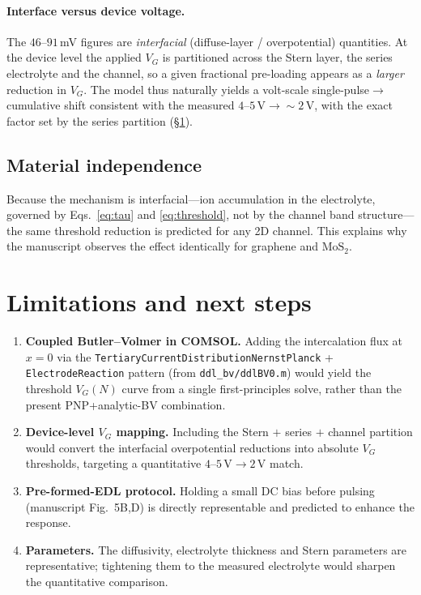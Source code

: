 \documentclass[11pt,a4paper]{article}
\begin{document}
\paragraph{Interface versus device voltage.} The $46$--$91$\,mV figures are
\emph{interfacial} (diffuse-layer / overpotential) quantities. At the device
level the applied $V_G$ is partitioned across the Stern layer, the series
electrolyte and the channel, so a given fractional pre-loading appears as a
\emph{larger} reduction in $V_G$. The model thus naturally yields a volt-scale
single-pulse$\to$cumulative shift consistent with the measured
$4$--$5\,\text{V}\to{\sim}2\,\text{V}$, with the exact factor set by the series
partition (\S\ref{sec:next}).

\subsection{Material independence}
Because the mechanism is interfacial---ion accumulation in the electrolyte,
governed by Eqs.~\eqref{eq:tau} and \eqref{eq:threshold}, not by the channel band
structure---the same threshold reduction is predicted for any 2D channel. This
explains why the manuscript observes the effect identically for graphene and
$\mathrm{MoS_2}$.

\section{Limitations and next steps}\label{sec:next}
\begin{enumerate}
\item \textbf{Coupled Butler--Volmer in COMSOL.} Adding the intercalation flux at
$x=0$ via the \texttt{TertiaryCurrentDistributionNernstPlanck} +
\texttt{ElectrodeReaction} pattern (from \texttt{ddl\_bv/ddlBV0.m}) would yield
the threshold $V_G(N)$ curve from a single first-principles solve, rather than
the present PNP+analytic-BV combination.
\item \textbf{Device-level $V_G$ mapping.} Including the Stern $+$ series $+$
channel partition would convert the interfacial overpotential reductions into
absolute $V_G$ thresholds, targeting a quantitative
$4$--$5\,\text{V}\to2\,\text{V}$ match.
\item \textbf{Pre-formed-EDL protocol.} Holding a small DC bias before pulsing
(manuscript Fig.~5B,D) is directly representable and predicted to enhance the
response.
\item \textbf{Parameters.} The diffusivity, electrolyte thickness and Stern
parameters are representative; tightening them to the measured electrolyte would
sharpen the quantitative comparison.
\end{enumerate}
\end{document}
